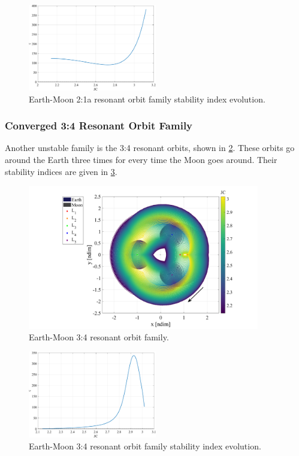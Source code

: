 \begin{figure}[ht]
    \centering
    \includegraphics[width=0.5\textwidth]{figures/Resonant2_1aStability.pdf}
    \caption{Earth-Moon 2:1a resonant orbit family stability index evolution.}
    \label{fig:2_1aResonantStability}
\end{figure}

\subsubsection{Converged 3:4 Resonant Orbit Family}
Another unstable family is the 3:4 resonant orbits, shown in \cref{fig:3_4Resonant}. These orbits
go around the Earth three times for every time the Moon goes around. Their stability indices are
given in \cref{fig:3_4ResonantStability}.

\begin{figure}[ht]
    \centering
    \includegraphics[width=0.9\textwidth]{figures/Resonant3_4Family.pdf}
    \caption{Earth-Moon 3:4 resonant orbit family.}
    \label{fig:3_4Resonant}
\end{figure}

\begin{figure}[ht]
    \centering
    \includegraphics[width=0.5\textwidth]{figures/Resonant3_4Stability.pdf}
    \caption{Earth-Moon 3:4 resonant orbit family stability index evolution.}
    \label{fig:3_4ResonantStability}
\end{figure}
